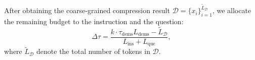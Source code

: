 After obtaining the coarse-grained compression result $\mathcal{D}=\{x_i\}_{i=1}^{\widetilde{L}_{\mathcal{D}}}$, we allocate the remaining budget to the instruction and the question:
\begin{equation}
    \Delta\tau%
    = \frac{k\cdot \tau_{\text{dems}}L_{\text{dems}} - \widetilde{L}_{\mathcal{D}}}
    {L_{\text{ins}} + L_{\text{que}}},
    \label{eq:adjust_tau}
\end{equation}
where $\widetilde{L}_{\mathcal{D}}$ denote the total number of tokens in $\mathcal{D}$.





